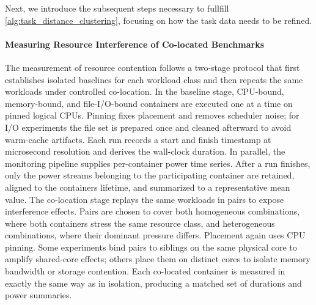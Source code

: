 Next, we introduce the subsequent steps necessary to fullfill \ref{alg:task_distance_clustering}, focusing on how the task data needs to be refined.

\paragraph{Measuring Resource Interference of Co-located Benchmarks}
\label{sec:measuring_resource_contention}

The measurement of resource contention follows a two-stage protocol that first establishes isolated baselines for each workload class and then repeats the same workloads under controlled co-location. In the baseline stage, CPU-bound, memory-bound, and file-I/O-bound containers are executed one at a time on pinned logical CPUs. Pinning fixes placement and removes scheduler noise; for I/O experiments the file set is prepared once and cleaned afterward to avoid warm-cache artifacts. Each run records a start and finish timestamp at microsecond resolution and derives the wall-clock duration. In parallel, the monitoring pipeline supplies per-container power time series. After a run finishes, only the power streams belonging to the participating container are retained, aligned to the containers lifetime, and summarized to a representative mean value.
The co-location stage replays the same workloads in pairs to expose interference effects. Pairs are chosen to cover both homogeneous combinations, where both containers stress the same resource class, and heterogeneous combinations, where their dominant pressure differs. Placement again uses CPU pinning. Some experiments bind pairs to siblings on the same physical core to amplify shared-core effects; others place them on distinct cores to isolate memory bandwidth or storage contention. Each co-located container is measured in exactly the same way as in isolation, producing a matched set of durations and power summaries.



